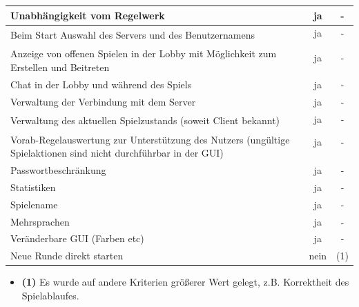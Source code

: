 \documentclass{article}
\begin{document}
\begin{tabular}{|l|c|c|}
   Unabhängigkeit vom Regelwerk & ja & - \\ \hline
   \multirow{2}{80mm}{Beim Start Auswahl des Servers und des Benutzernamens} & ja & - \\ & & \\ \hline
   \multirow{2}{80mm}{Anzeige von offenen Spielen in der Lobby mit Möglichkeit zum Erstellen und Beitreten} & ja & - \\ & & \\ \hline
   Chat in der Lobby und während des Spiels & ja & - \\ \hline
   Verwaltung der Verbindung mit dem Server & ja & - \\ \hline
  \multirow{2}{80mm}{Verwaltung des aktuellen Spielzustands (soweit Client bekannt)} & ja & - \\ & & \\ \hline
  \multirow{3}{80mm}{Vorab-Regelauswertung zur Unterstützung des Nutzers (ungültige Spielaktionen sind nicht durchführbar in der GUI)} & ja & - \\ & & \\ & & \\ \hline \hline
   Passwortbeschränkung & ja & -\\ \hline
   Statistiken & ja & - \\ \hline
   Spielename & ja & -\\ \hline
   Mehrsprachen & ja & - \\ \hline
   Veränderbare GUI (Farben etc) & ja & - \\ \hline
   Neue Runde direkt starten & nein & (1) \\ \hline
\end{tabular}

\begin{itemize}
	\item \textbf{(1)} Es wurde auf andere Kriterien größerer Wert gelegt, z.B. Korrektheit des Spielablaufes. \\
\end{itemize}
\end{document}
